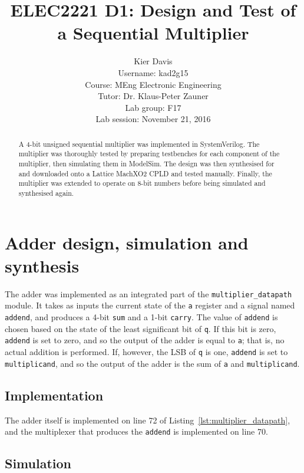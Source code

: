 \documentclass[a4paper]{article}
\title{ELEC2221 D1: Design and Test of a Sequential Multiplier}
\author{Kier Davis \\
Username: kad2g15 \\
Course: MEng Electronic Engineering \\
Tutor: Dr. Klaus-Peter Zauner \\
Lab group: F17 \\
Lab session: November 21, 2016}
\begin{document}
\maketitle

\begin{abstract}
  A 4-bit unsigned sequential multiplier was implemented in SystemVerilog. The multiplier was thoroughly tested by preparing testbenches for each component of the multiplier, then simulating them in ModelSim. The design was then synthesised for and downloaded onto a Lattice MachXO2 CPLD and tested manually. Finally, the multiplier was extended to operate on 8-bit numbers before being simulated and synthesised again.
\end{abstract}


\section{Adder design, simulation and synthesis}
\label{sec:adder}

The adder was implemented as an integrated part of the \texttt{multiplier\_datapath} module. It takes as inputs the current state of the \texttt{a} register and a signal named \texttt{addend}, and produces a 4-bit \texttt{sum} and a 1-bit \texttt{carry}. The value of \texttt{addend} is chosen based on the state of the least significant bit of \texttt{q}. If this bit is zero, \texttt{addend} is set to zero, and so the output of the adder is equal to \texttt{a}; that is, no actual addition is performed. If, however, the LSB of \texttt{q} is one, \texttt{addend} is set to \texttt{multiplicand}, and so the output of the adder is the sum of \texttt{a} and \texttt{multiplicand}.

\subsection{Implementation}
\label{sec:adder:impl}

The adder itself is implemented on line 72 of Listing~\ref{lst:multiplier_datapath}, and the multiplexer that produces the \texttt{addend} is implemented on line 70.

\subsection{Simulation}
\label{sec:adder:sim}
\end{document}
